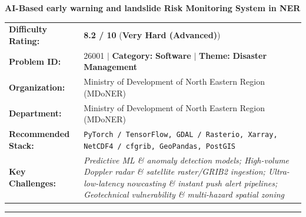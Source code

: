 \documentclass[10pt,a4paper]{article}
\begin{document}
\begin{tcolorbox}[pscard, title={"\textbf{SIH26001} \quad $\vert$ \quad AI-Based early warning and landslide Risk Monitoring System in NER}]
\textbf{\large AI-Based early warning and landslide Risk Monitoring System in NER}\\[0.25cm]

\begin{tabular}{@{}lp{12.5cm}@{}}
\textbf{Difficulty Rating:} & \textcolor{diffveryhard}{\textbf{\Large 8.2 / 10}} \quad (\textbf{Very Hard (Advanced)}) \\
\textbf{Problem ID:} & 26001 \quad $\vert$ \quad \textbf{Category:} \textbf{Software} \quad $\vert$ \quad \textbf{Theme:} \textbf{Disaster Management} \\
\textbf{Organization:} & Ministry of Development of North Eastern Region (MDoNER) \\
\textbf{Department:} & Ministry of Development of North Eastern Region (MDoNER) \\
\textbf{Recommended Stack:} & \texttt{PyTorch / TensorFlow, GDAL / Rasterio, Xarray, NetCDF4 / cfgrib, GeoPandas, PostGIS} \\
\textbf{Key Challenges:} & \textit{\small Predictive ML \& anomaly detection models; High-volume Doppler radar \& satellite raster/GRIB2 ingestion; Ultra-low-latency nowcasting \& instant push alert pipelines; Geotechnical vulnerability \& multi-hazard spatial zoning} \\
\end{tabular}

\vspace{0.2cm}
\hrule
\vspace{0.2cm}


\end{tcolorbox}
\end{document}
